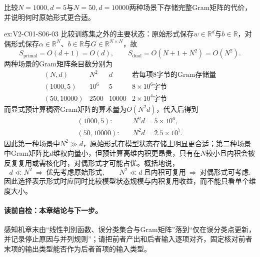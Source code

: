 \begin{SLChapterExercisePairSection}
\begin{exercise}\label{ex:V2-C01-S06-03}
比较$N=1000,d=5$与$N=50,d=10000$两种场景下存储完整Gram矩阵的代价，并说明何时原始形式更合适。
\end{exercise}
\ifSLFullEdition
{}\label{sol:V2-C01-S06-03}
\begin{chapterexercisesolution}{ex:V2-C01-S06-03}
比较训练集之外的主要状态：原始形式保存$w\in\mathbb R^d$与$b\in\mathbb R$，对偶形式保存$\alpha\in\mathbb R^N$、$b\in\mathbb R$与$G\in\mathbb R^{N\times N}$，故
\[
S_{\mathrm{primal}}=O(d+1)=O(d),
\qquad
S_{\mathrm{dual}}=O(N+1+N^2)=O(N^2).
\]
两种场景的Gram矩阵条目数分别为
\[
\begin{array}{c|c|c|c}
(N,d) & N^2 & d & \text{若每项8字节的Gram存储量}\\ \hline
(1000,5) & 10^6 & 5 & 8\times10^6\text{字节}\\
(50,10000) & 2500 & 10000 & 2\times10^4\text{字节}
\end{array}
\]
而显式预计算稠密Gram矩阵的算术量为$O(N^2d)$，代入后得到
\[
\begin{aligned}
(1000,5):&\quad N^2d=5\times10^6,\\
(50,10000):&\quad N^2d=2.5\times10^7.
\end{aligned}
\]
因此第一种场景中$N^2\gg d$，原始形式在模型状态存储上明显更合适；第二种场景中Gram矩阵比$d$维权向量小，但预计算高维内积更昂贵，只有在$N$较小且内积会被反复复用或需核化时，对偶形式才可能占优。概括地说，
\[
d\ll N^2\ \Longrightarrow\ \text{优先考虑原始形式},
\qquad
N^2\ll d\ \text{且内积可复用}\ \Longrightarrow\ \text{对偶形式可考虑}.
\]
因此选择表示形式时应同时比较模型状态规模与内积复用收益，而不能只看单个维度大小。
\end{chapterexercisesolution}
\fi

\end{SLChapterExercisePairSection}
\paragraph{读前自检：本章结论与下一步。}感知机章末由“线性判别函数、误分类集合与Gram矩阵”落到“仅在误分类点更新，并记录停止原因与并列规则”；请把前者产出和后者输入逐项对齐，固定核对前者末项的输出类型能否作为后者首项的输入类型。\par

